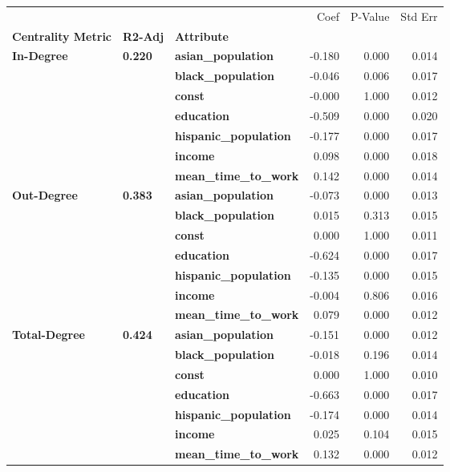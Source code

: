 \begin{tabular}{lllrrr}
\toprule
             &       &                   &   Coef &  P-Value &  Std Err \\
\textbf{Centrality Metric} & \textbf{R2-Adj} & \textbf{Attribute} &        &          &          \\
\midrule
\multirow{7}{*}{\textbf{In-Degree}} & \multirow{7}{*}{\textbf{0.220}} & \textbf{asian\_population} & -0.180 &    0.000 &    0.014 \\
             &       & \textbf{black\_population} & -0.046 &    0.006 &    0.017 \\
             &       & \textbf{const} & -0.000 &    1.000 &    0.012 \\
             &       & \textbf{education} & -0.509 &    0.000 &    0.020 \\
             &       & \textbf{hispanic\_population} & -0.177 &    0.000 &    0.017 \\
             &       & \textbf{income} &  0.098 &    0.000 &    0.018 \\
             &       & \textbf{mean\_time\_to\_work} &  0.142 &    0.000 &    0.014 \\
\cline{1-6}
\cline{2-6}
\multirow{7}{*}{\textbf{Out-Degree}} & \multirow{7}{*}{\textbf{0.383}} & \textbf{asian\_population} & -0.073 &    0.000 &    0.013 \\
             &       & \textbf{black\_population} &  0.015 &    0.313 &    0.015 \\
             &       & \textbf{const} &  0.000 &    1.000 &    0.011 \\
             &       & \textbf{education} & -0.624 &    0.000 &    0.017 \\
             &       & \textbf{hispanic\_population} & -0.135 &    0.000 &    0.015 \\
             &       & \textbf{income} & -0.004 &    0.806 &    0.016 \\
             &       & \textbf{mean\_time\_to\_work} &  0.079 &    0.000 &    0.012 \\
\cline{1-6}
\cline{2-6}
\multirow{7}{*}{\textbf{Total-Degree}} & \multirow{7}{*}{\textbf{0.424}} & \textbf{asian\_population} & -0.151 &    0.000 &    0.012 \\
             &       & \textbf{black\_population} & -0.018 &    0.196 &    0.014 \\
             &       & \textbf{const} &  0.000 &    1.000 &    0.010 \\
             &       & \textbf{education} & -0.663 &    0.000 &    0.017 \\
             &       & \textbf{hispanic\_population} & -0.174 &    0.000 &    0.014 \\
             &       & \textbf{income} &  0.025 &    0.104 &    0.015 \\
             &       & \textbf{mean\_time\_to\_work} &  0.132 &    0.000 &    0.012 \\
\bottomrule
\end{tabular}
